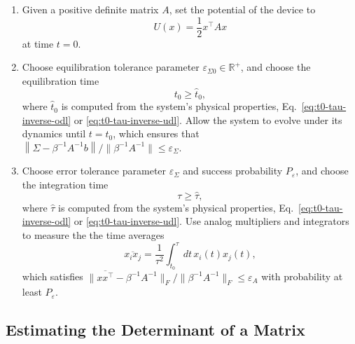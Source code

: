 \documentclass[prx,onecolumn,floatfix,longbibliography,notitlepage, nofootinbib,12pt]{revtex4-2}
\renewcommand{\geq}{\geqslant}
\renewcommand{\leq}{\leqslant}
\begin{document}
\begin{tcolorbox}[title={Inverse Estimation Protocol},breakable]
\begin{enumerate}
\item Given a positive definite matrix $A$, set the potential of the device to
\begin{equation}
    U(x) = \frac{1}{2} x^\intercal A x
\end{equation}
at time $t=0$.
\item Choose equilibration tolerance parameter $\varepsilon_{\Sigma 0} \in \mathbb{R}^+$, and choose the equilibration time
\begin{equation}
\label{eq:UDL-eq-time}
t_0 \geq \widehat{t}_0,
\end{equation}
where $\widehat{t}_0$ is computed from the system's physical properties, Eq.~\eqref{eq:t0-tau-inverse-odl} or \eqref{eq:t0-tau-inverse-udl}. Allow the system to evolve under its dynamics until $t=t_0$, which ensures that $\left\|\Sigma - \beta^{-1} A^{-1} b\right\|/\|\beta^{-1}A^{-1}\| \leq \varepsilon_\Sigma$.
\item  Choose error tolerance parameter $\varepsilon_\Sigma$ and success probability $P_\varepsilon$, and choose the integration time
\begin{equation}
    \tau \geq \widehat{\tau},
\end{equation}
where $\widehat{\tau}$ is computed from the system's physical properties, Eq.~\eqref{eq:t0-tau-inverse-odl} or \eqref{eq:t0-tau-inverse-udl}. Use analog multipliers and integrators to measure the the time averages
\begin{equation}
    \overline{x_i x_j} = \frac{1}{\tau^2} \int_{t_0}^\tau dt\, x_i(t) x_j(t),
\end{equation}
which satisfies $\|\overline{x x^\intercal} - \beta^{-1}A^{-1}\|_F/\|\beta^{-1}A^{-1}\|_F \leq \varepsilon_A$ with probability at least $P_\varepsilon$.
\end{enumerate}
\end{tcolorbox}
\medskip









\subsection{Estimating the Determinant of a Matrix}
\end{document}

